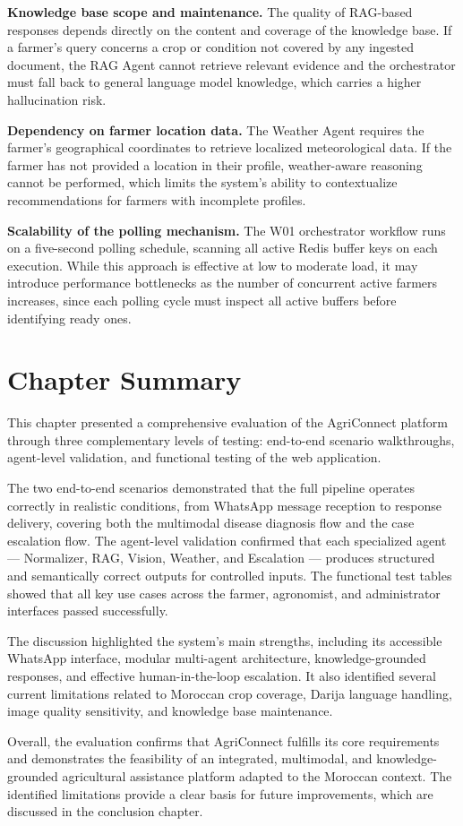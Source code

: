 \textbf{Knowledge base scope and maintenance.} The quality of RAG-based responses depends directly on the content and coverage of the knowledge base. If a farmer's query concerns a crop or condition not covered by any ingested document, the RAG Agent cannot retrieve relevant evidence and the orchestrator must fall back to general language model knowledge, which carries a higher hallucination risk.

\textbf{Dependency on farmer location data.} The Weather Agent requires the farmer's geographical coordinates to retrieve localized meteorological data. If the farmer has not provided a location in their profile, weather-aware reasoning cannot be performed, which limits the system's ability to contextualize recommendations for farmers with incomplete profiles.

\textbf{Scalability of the polling mechanism.} The W01 orchestrator workflow runs on a five-second polling schedule, scanning all active Redis buffer keys on each execution. While this approach is effective at low to moderate load, it may introduce performance bottlenecks as the number of concurrent active farmers increases, since each polling cycle must inspect all active buffers before identifying ready ones.

\section{Chapter Summary}

This chapter presented a comprehensive evaluation of the AgriConnect platform through three complementary levels of testing: end-to-end scenario walkthroughs, agent-level validation, and functional testing of the web application.

The two end-to-end scenarios demonstrated that the full pipeline operates correctly in realistic conditions, from WhatsApp message reception to response delivery, covering both the multimodal disease diagnosis flow and the case escalation flow. The agent-level validation confirmed that each specialized agent — Normalizer, RAG, Vision, Weather, and Escalation — produces structured and semantically correct outputs for controlled inputs. The functional test tables showed that all key use cases across the farmer, agronomist, and administrator interfaces passed successfully.

The discussion highlighted the system's main strengths, including its accessible WhatsApp interface, modular multi-agent architecture, knowledge-grounded responses, and effective human-in-the-loop escalation. It also identified several current limitations related to Moroccan crop coverage, Darija language handling, image quality sensitivity, and knowledge base maintenance.

Overall, the evaluation confirms that AgriConnect fulfills its core requirements and demonstrates the feasibility of an integrated, multimodal, and knowledge-grounded agricultural assistance platform adapted to the Moroccan context. The identified limitations provide a clear basis for future improvements, which are discussed in the conclusion chapter.
